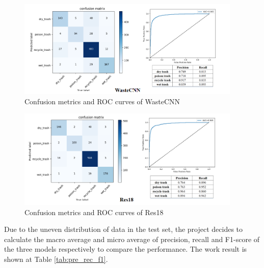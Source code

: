 \documentclass{article}
\begin{document}
\begin{figure}[!h]
    \begin{centering}
    \includegraphics[width=0.95\textwidth]{WasteCNN_eva.png}
    \par\end{centering}
    \caption{Confusion metrics and ROC curves of WasteCNN}
    \label{fig:WasteCNN_confusion_ROC}
\end{figure}

\begin{figure}[!h]
    \begin{centering}
    \includegraphics[width=0.95\textwidth]{Res18_eva.png}
    \par\end{centering}
    \caption{Confusion metrics and ROC curves of Res18}
    \label{fig:Res18_confusion_ROC}
\end{figure}


Due to the uneven distribution of data in the test set, the project decides to calculate the macro average and micro average of precision, recall and F1-score of the three models respectively to compare the performance. The work result is shown at Table \ref{tab:pre_rec_f1}.
\end{document}
